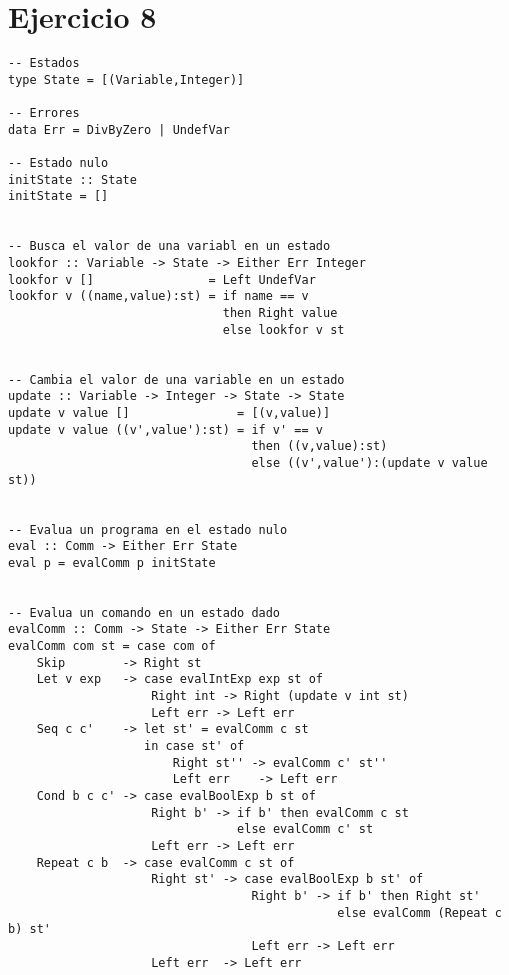 \documentclass[12pt,a4paper]{article}
\begin{document}
\section*{Ejercicio 8}
\begin{verbatim}
-- Estados
type State = [(Variable,Integer)]

-- Errores
data Err = DivByZero | UndefVar

-- Estado nulo
initState :: State
initState = []


-- Busca el valor de una variabl en un estado
lookfor :: Variable -> State -> Either Err Integer
lookfor v []                = Left UndefVar
lookfor v ((name,value):st) = if name == v
                              then Right value
                              else lookfor v st


-- Cambia el valor de una variable en un estado
update :: Variable -> Integer -> State -> State
update v value []               = [(v,value)]
update v value ((v',value'):st) = if v' == v 
                                  then ((v,value):st)
                                  else ((v',value'):(update v value st))


-- Evalua un programa en el estado nulo
eval :: Comm -> Either Err State
eval p = evalComm p initState


-- Evalua un comando en un estado dado
evalComm :: Comm -> State -> Either Err State
evalComm com st = case com of
    Skip        -> Right st
    Let v exp   -> case evalIntExp exp st of
                    Right int -> Right (update v int st)
                    Left err -> Left err
    Seq c c'    -> let st' = evalComm c st
                   in case st' of
                       Right st'' -> evalComm c' st''
                       Left err    -> Left err
    Cond b c c' -> case evalBoolExp b st of
                    Right b' -> if b' then evalComm c st
                                else evalComm c' st
                    Left err -> Left err
    Repeat c b  -> case evalComm c st of
                    Right st' -> case evalBoolExp b st' of
                                  Right b' -> if b' then Right st'
                                              else evalComm (Repeat c b) st'
                                  Left err -> Left err
                    Left err  -> Left err

\end{verbatim}
\newpage
\end{document}
